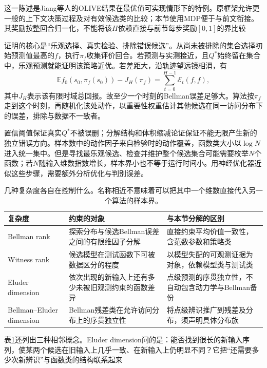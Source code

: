 这一陈述是Jiang等人的OLIVE结果在最优值可实现情形下的特例。原框架允许更一般的上下文决策过程及对有效候选类的比较；本节使用MDP便于与前文衔接。其奖励按整回合归一化，不能将该$H$依赖直接与前节每步奖励$[0,1]$的界比较

证明的核心是“乐观选择、真实检验、排除错误候选”。从尚未被排除的集合选择初始预测值最高的$f$，执行$\pi_f$收集评价回合。若预测与实测接近，且$Q^*$始终留在集合中，乐观预测就能证明该策略近优。若差距大，沿轨迹望远镜相消，有
\[
 \mathbb E f_0(s_0,\pi_f(s_0))-J_H(\pi_f)
                 =\sum_{t=0}^{H-1}\mathcal E_t(f,f),
\]
其中$J_H$表示该有限时域总回报。故至少一个时刻的Bellman误差足够大。算法按$\pi_f$走到这个时刻，再随机化该处动作，以重要性权重估计其他候选在同一访问分布下的误差，排除与数据不一致者。

置信阈值保证真实$Q^*$不被误删；分解结构和体积缩减论证保证不能无限产生新的独立错误方向。样本数中的动作因子来自检验时的动作覆盖，函数类大小以$\log N$进入统一集中。但是寻找最乐观候选、检查并维护整个候选集合可能需要枚举$N$个函数；若$N$随输入维数指数增长，样本界小也不等于运行时间小。用神经优化器近似这些步骤，需要额外分析优化与判别误差。

\begin{table}[t]
  \centering
  \small
  \begin{tabularx}{\linewidth}{>{\raggedright\arraybackslash}p{28mm} >{\raggedright\arraybackslash}X >{\raggedright\arraybackslash}X}
    \toprule
    复杂度 & 约束的对象 & 与本节分解的区别 \\
    \midrule
    Bellman rank & 探索分布与候选Bellman误差之间的有限维因子分解 & 直接约束平均价值一致性，含范数参数和策略类 \\
    Witness rank & 候选模型在测试函数下可被数据区分的程度 & 以模型失配的可观测证据为对象，依赖模型类与测试类 \\
    Eluder dimension & 依次出现的新输入上还有多少未被旧观测约束的函数差异 & 点级预测的序贯独立性，不自动包含动力学与Bellman备份 \\
    Bellman--Eluder dimension & Bellman残差类在允许访问分布上的序贯独立性 & 将点级辨识推广到残差及分布，须声明具体分布族 \\
    \bottomrule
  \end{tabularx}
  \caption{几种复杂度各自在控制什么。名称相近不意味着可以把其中一个维数直接代入另一个算法的样本界。}
  \label{tab:rl-learning-function-complexities}
\end{table}

表\ref{tab:rl-learning-function-complexities}还列出三种相邻概念。Eluder dimension问的是：能否找到很长的新输入序列，使某两个候选在旧输入上几乎一致、在新输入上仍明显不同？它把“还需要多少次新辨识”与函数类的结构联系起来

